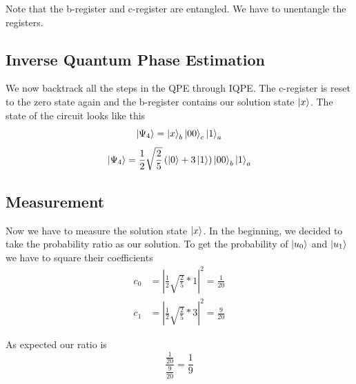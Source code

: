    Note that the b-register and c-register are entangled. We have to unentangle the registers.

\subsection{Inverse Quantum Phase Estimation}
    We now backtrack all the steps in the QPE through IQPE.
    The c-register is reset to the zero state again and the b-register contains our solution state $\ket x$.
    The state of the circuit looks like this
    \begin{equation}
    \ket{\Psi_4}= \ket{x}_b \ket{00}_c \ket{1}_a 
    \end{equation}
    \begin{equation}
    \ket{\Psi_4}=\frac{1}{2}\sqrt{\frac{2}{5}}  \left(\ket{0} +3 \ket{1} \right) \ket{00}_b \ket{1}_a
    \end{equation}

\subsection{Measurement}
    Now we have to measure the solution state $\ket x$.
    In the beginning, we decided to take the probability ratio as our solution. 
    To get the probability of $\ket{u_0}$ and $\ket{u_1}$ we have to square their coefficients
\begin{equation}
\begin{split}
c_0&=\left|\frac{1}{2}\sqrt{\frac{2}{5}}*1\right|^2 = \frac{1}{20}\\
c_1&=\left|\frac{1}{2}\sqrt{\frac{2}{5}}*3\right|^2 = \frac{9}{20}
\end{split}
\end{equation}

As expected our ratio is 
\begin{equation}
 \frac{\frac{1}{20}}{ \frac{9}{20} } = \frac 1 9
\end{equation}

